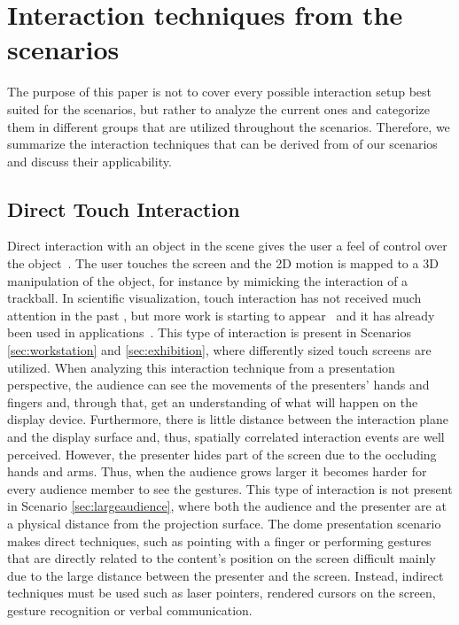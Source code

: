 \documentclass[review,journal]{vgtc}         %
\begin{document}
\section{Interaction techniques from the scenarios} \label{sec:techniques}
The purpose of this paper is not to cover every possible interaction setup best suited for the scenarios, but rather to analyze the current ones and categorize them in different groups that are utilized throughout the scenarios.
Therefore, we summarize the interaction techniques that can be derived from of our scenarios and discuss their applicability.

\subsection{Direct Touch Interaction}
Direct interaction with an object in the scene gives the user a feel of control over the object~\cite{isenberg2009studying}. 
The user touches the screen and the 2D motion is mapped to a 3D manipulation of the object, for instance by mimicking the interaction of a trackball.
In scientific visualization, touch interaction has not received much attention in the past \cite{isenberg:hal-00781512}, but more work is starting to appear~\cite{Klein:2012:DSD:2322389.2322403} and it has already been used in applications~\cite{LRFPY11}.
This type of interaction is present in Scenarios \ref{sec:workstation} and \ref{sec:exhibition}, where differently sized touch screens are utilized. 
When analyzing this interaction technique from a presentation perspective, the audience can see the movements of the presenters' hands and fingers and, through that, get an understanding of what will happen on the display device.
Furthermore, there is little distance between the interaction plane and the display surface and, thus, spatially correlated interaction events are well perceived.
However, the presenter hides part of the screen due to the occluding hands and arms.
Thus, when the audience grows larger it becomes harder for every audience member to see the gestures.
This type of interaction is not present in Scenario \ref{sec:largeaudience}, where both the audience and the presenter are at a physical distance from the projection surface.
The dome presentation scenario makes direct techniques, such as pointing with a finger or performing gestures that are directly related to the content's position on the screen difficult mainly due to the large distance between the presenter and the screen.
Instead, indirect techniques must be used such as laser pointers, rendered cursors on the screen, gesture recognition or verbal communication.
\end{document}
